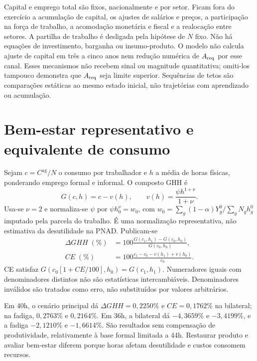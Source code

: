 Capital e emprego total são fixos, nacionalmente e por setor. Ficam fora do exercício a acumulação de capital, os ajustes de salários e preços, a participação na força de trabalho, a acomodação monetária e fiscal e a realocação entre setores. A partilha de trabalho é desligada pela hipótese de $N$ fixo. Não há equações de investimento, barganha ou insumo-produto. O modelo não calcula ajuste de capital em três a cinco anos nem redução numérica de $A_{\mathrm{req}}$ por esse canal. Esses mecanismos não recebem sinal ou magnitude quantitativa; omiti-los tampouco demonstra que $A_{\mathrm{req}}$ seja limite superior. Sequências de tetos são comparações estáticas ao mesmo estado inicial, não trajetórias com aprendizado ou acumulação.

\FloatBarrier
\section{Bem-estar representativo e equivalente de consumo}\label{app:welfare_additional}
Sejam $c=C^{\mathrm{ag}}/N$ o consumo por trabalhador e $h$ a média de horas físicas, ponderando emprego formal e informal. O composto GHH é
\begin{equation}\label{eq:app_ghh}
G(c,h)=c-v(h),\qquad v(h)=\frac{\psi h^{1+\nu}}{1+\nu}.
\end{equation}
Usa-se $\nu=2$ e normaliza-se $\psi$ por $\psi h_0^\nu=w_0$, com $w_0=\sum_g(1-\alpha)Y_g^0/\sum_gN_gh_g^0$ imputado pela parcela do trabalho. É uma normalização representativa, não estimativa da desutilidade na PNAD. Publicam-se
\begin{align}
\Delta GHH\;(\%)&=100\frac{G(c_1,h_1)-G(c_0,h_0)}{G(c_0,h_0)},\label{eq:app_dghh}\\
CE\;(\%)&=100\frac{c_1-c_0-v(h_1)+v(h_0)}{c_0}.\label{eq:app_ce}
\end{align}
CE satisfaz $G(c_0[1+CE/100],h_0)=G(c_1,h_1)$. Numeradores iguais com denominadores distintos não são estatísticas intercambiáveis. Denominadores inválidos são tratados como erro, não substituídos por valores arbitrários.

Em 40h, o cenário principal dá $\Delta GHH=0{,}2250\%$ e $CE=0{,}1762\%$ na bilateral; na fadiga, $0{,}2763\%$ e $0{,}2164\%$. Em 36h, a bilateral dá $-4{,}3659\%$ e $-3{,}4199\%$, e a fadiga $-2{,}1210\%$ e $-1{,}6614\%$. São resultados sem compensação de produtividade, relativamente à base formal limitada a 44h. Restaurar produto e avaliar bem-estar diferem porque horas afetam desutilidade e custos consomem recursos.

